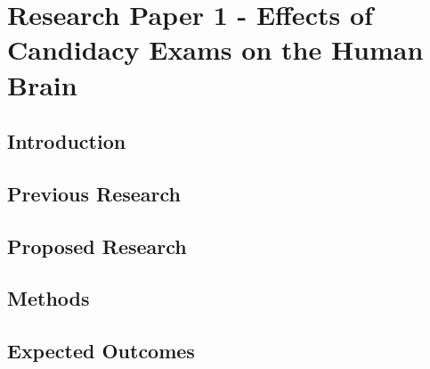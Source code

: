 %
%
% 
%


\chapter{Research Paper 1 - Effects of Candidacy Exams on the Human Brain}
\clearpage

\section{Introduction}

\section{Previous Research}

\section{Proposed Research}

\section{Methods}

\section{Expected Outcomes} 


